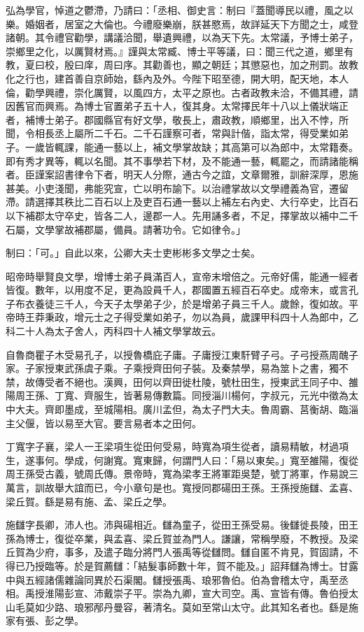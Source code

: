 \begin{pinyinscope}
弘為學官，悼道之鬱滯，乃請曰：「丞相、御史言：制曰『蓋聞導民以禮，風之以樂。婚姻者，居室之大倫也。今禮廢樂崩，朕甚愍焉，故詳延天下方聞之士，咸登諸朝。其令禮官勸學，講議洽聞，舉遺興禮，以為天下先。太常議，予博士弟子，崇鄉里之化，以厲賢材焉。』謹與太常臧、博士平等議，曰：聞三代之道，鄉里有教，夏曰校，殷曰庠，周曰序。其勸善也，顯之朝廷；其懲惡也，加之刑罰。故教化之行也，建首善自京師始，繇內及外。今陛下昭至德，開大明，配天地，本人倫，勸學興禮，崇化厲賢，以風四方，太平之原也。古者政教未洽，不備其禮，請因舊官而興焉。為博士官置弟子五十人，復其身。太常擇民年十八以上儀狀端正者，補博士弟子。郡國縣官有好文學，敬長上，肅政教，順鄉里，出入不悖，所聞，令相長丞上屬所二千石。二千石謹察可者，常與計偕，詣太常，得受業如弟子。一歲皆輒課，能通一藝以上，補文學掌故缺；其高第可以為郎中，太常籍奏。即有秀才異等，輒以名聞。其不事學若下材，及不能通一藝，輒罷之，而請諸能稱者。臣謹案詔書律令下者，明天人分際，通古今之誼，文章爾雅，訓辭深厚，恩施甚美。小吏淺聞，弗能究宣，亡以明布諭下。以治禮掌故以文學禮義為官，遷留滯。請選擇其秩比二百石以上及吏百石通一藝以上補左右內史、大行卒史，比百石以下補郡太守卒史，皆各二人，邊郡一人。先用誦多者，不足，擇掌故以補中二千石屬，文學掌故補郡屬，備員。請著功令。它如律令。」

制曰：「可。」自此以來，公卿大夫士吏彬彬多文學之士矣。

昭帝時舉賢良文學，增博士弟子員滿百人，宣帝末增倍之。元帝好儒，能通一經者皆復。數年，以用度不足，更為設員千人，郡國置五經百石卒史。成帝末，或言孔子布衣養徒三千人，今天子太學弟子少，於是增弟子員三千人。歲餘，復如故。平帝時王莽秉政，增元士之子得受業如弟子，勿以為員，歲課甲科四十人為郎中，乙科二十人為太子舍人，丙科四十人補文學掌故云。

自魯商瞿子木受易孔子，以授魯橋庇子庸。子庸授江東馯臂子弓。子弓授燕周醜子家。子家授東武孫虞子乘。子乘授齊田何子裝。及秦禁學，易為筮卜之書，獨不禁，故傳受者不絕也。漢興，田何以齊田徙杜陵，號杜田生，授東武王同子中、雒陽周王孫、丁寬、齊服生，皆著易傳數篇。同授淄川楊何，字叔元，元光中徵為太中大夫。齊即墨成，至城陽相。廣川孟但，為太子門大夫。魯周霸、莒衡胡、臨淄主父偃，皆以易至大官。要言易者本之田何。

丁寬字子襄，梁人一王梁項生從田何受易，時寬為項生從者，讀易精敏，材過項生，遂事何。學成，何謝寬。寬東歸，何謂門人曰：「易以東矣。」寬至雒陽，復從周王孫受古義，號周氏傳。景帝時，寬為梁孝王將軍距吳楚，號丁將軍，作易說三萬言，訓故舉大誼而已，今小章句是也。寬授同郡碭田王孫。王孫授施讎、孟喜、梁丘賀。繇是易有施、孟、梁丘之學。

施讎字長卿，沛人也。沛與碭相近。讎為童子，從田王孫受易。後讎徙長陵，田王孫為博士，復從卒業，與孟喜、梁丘賀並為門人。謙讓，常稱學廢，不教授。及梁丘賀為少府，事多，及遣子臨分將門人張禹等從讎問。讎自匿不肯見，賀固請，不得已乃授臨等。於是賀薦讎：「結髮事師數十年，賀不能及。」詔拜讎為博士。甘露中與五經諸儒雜論同異於石渠閣。讎授張禹、琅邪魯伯。伯為會稽太守，禹至丞相。禹授淮陽彭宣、沛戴崇子平。崇為九卿，宣大司空。禹、宣皆有傳。魯伯授太山毛莫如少路、琅邪邴丹曼容，著清名。莫如至常山太守。此其知名者也。繇是施家有張、彭之學。


\end{pinyinscope}
